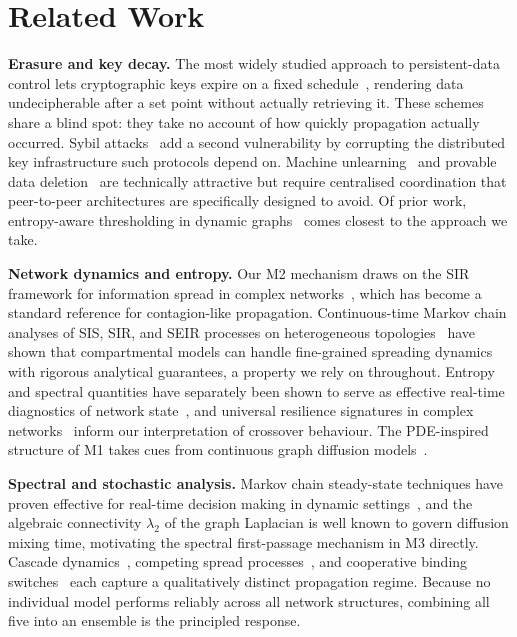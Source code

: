 \documentclass[conference]{IEEEtran}
\begin{document}
\section{Related Work}
\label{sec:related}

\textbf{Erasure and key decay.}
The most widely studied approach to persistent-data control lets
cryptographic keys expire on a fixed schedule~\cite{geambasu2009vanish,
tang2010fade,perlman2005ephemerizer}, rendering data undecipherable
after a set point without actually retrieving it.  These schemes
share a blind spot: they take no account of how quickly propagation
actually occurred.  Sybil attacks~\cite{douceur2002sybil,wolchok2010defeating}
add a second vulnerability by corrupting the distributed key
infrastructure such protocols depend on.  Machine
unlearning~\cite{bourtoule2021machine} and provable data
deletion~\cite{juliussen2023algorithms} are technically attractive
but require centralised coordination that peer-to-peer architectures
are specifically designed to avoid.  Of prior work, entropy-aware
thresholding in dynamic graphs~\cite{oesterling2024fair} comes
closest to the approach we take.

\textbf{Network dynamics and entropy.}
Our M2 mechanism draws on the SIR framework for information spread
in complex networks~\cite{pastor2015epidemic}, which has become a
standard reference for contagion-like propagation.  Continuous-time
Markov chain analyses of SIS, SIR, and SEIR processes on heterogeneous
topologies~\cite{sailaja2025stochastic} have shown that compartmental
models can handle fine-grained spreading dynamics with rigorous
analytical guarantees, a property we rely on throughout.  Entropy
and spectral quantities have separately been shown to serve as
effective real-time diagnostics of network state~\cite{zhao2024multi},
and universal resilience signatures in complex networks~\cite{gao2016universal}
inform our interpretation of crossover behaviour.  The PDE-inspired
structure of M1 takes cues from continuous graph diffusion
models~\cite{chamberlain2021grand,eliasof2024graph}.

\textbf{Spectral and stochastic analysis.}
Markov chain steady-state techniques have proven effective for
real-time decision making in dynamic settings~\cite{mohan2025realtime},
and the algebraic connectivity $\lambda_2$ of the graph Laplacian is
well known to govern diffusion mixing time, motivating the spectral
first-passage mechanism in M3 directly.  Cascade
dynamics~\cite{watts2002simple,guilbeault2018complex}, competing
spread processes~\cite{karrer2011competing}, and cooperative binding
switches~\cite{alon2019systems} each capture a qualitatively distinct
propagation regime.  Because no individual model performs reliably
across all network structures, combining all five into an ensemble
is the principled response.
\end{document}
